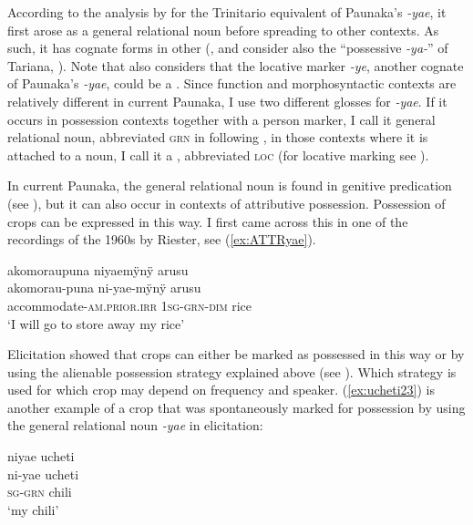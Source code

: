 According to the analysis by \citet[]{Rose2019a} for the Trinitario equivalent of Paunaka’s \textit{-yae}, it first arose as a general relational noun before spreading to other contexts. As such, it has cognate forms in other  (\citealt[14]{Rose2019a}, and consider also the “possessive \textit{-ya-}” of Tariana, \citealt[134]{Aikhenvald2003}). Note that \citet[150]{Danielsen2007} also considers that the  locative marker \textit{-ye}, another cognate of Paunaka’s \textit{-yae}, could be a . Since function and morphosyntactic contexts are relatively different in current Paunaka, I use two different glosses for \textit{-yae}. If it occurs in possession contexts together with a person marker, I call it general relational noun, abbreviated \textsc{grn} in following \citet[]{Rose2019a}, in those contexts where it is attached to a noun, I call it a , abbreviated \textsc{loc} (for locative marking see ).

In current Paunaka, the general relational noun is found in genitive predication (see ), but it can also occur in contexts of attributive possession. Possession of crops can be expressed in this way. I first came across this in one of the recordings  of the 1960s by Riester, see (\ref{ex:ATTRyae}). 

\ea\label{ex:ATTRyae}
\begingl 
\glpreamble akomoraupuna niyaemÿnÿ arusu\\
\gla akomorau-puna ni-yae-mÿnÿ arusu\\ 
\glb accommodate-\textsc{am.prior}.\textsc{irr} 1\textsc{sg}-\textsc{grn}-\textsc{dim} rice\\ 
\glft ‘I will go to store away my rice’\\ 
\endgl
\trailingcitation{[nxx-p630101g-1.006]}
\xe

Elicitation showed that crops can either be marked as possessed in this way or by using the alienable possession strategy explained above (see ). Which strategy is used for which crop may depend on frequency and speaker. (\ref{ex:ucheti23}) is another example of a crop that was spontaneously marked for possession by using the general relational noun \textit{-yae} in elicitation:

\ea\label{ex:ucheti23}
\begingl 
\glpreamble niyae ucheti\\
\gla ni-yae ucheti\\ 
\textsc{sg}-\textsc{grn} chili\\ 
\glft ‘my chili’\\ 
\endgl
\trailingcitation{[rxx-e181018le]}
\xe

